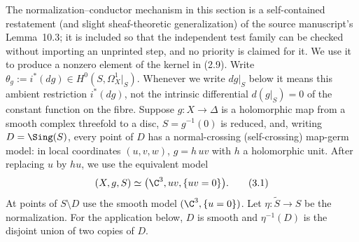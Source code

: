 The normalization--conductor mechanism in this section is a self-contained
restatement (and slight sheaf-theoretic generalization) of the source
manuscript's Lemma~10.3; it is included so that the independent test family
can be checked without importing an unprinted step, and no priority is
claimed for it.  We use it to produce a nonzero element of the kernel in
(2.9).  Write
\(\theta_g:=i^*(dg)\in H^0(S,\Omega^1_X|_S)\).  Whenever we write
$dg|_S$ below it means this ambient restriction $i^*(dg)$, not the intrinsic
differential $d(g|_S)=0$ of the constant function on the fibre.  Suppose
$g:X\to\Delta$ is a holomorphic map from a smooth complex threefold to a
disc, $S=g^{-1}(0)$ is reduced, and, writing $D=\Sing(S)$, every point of
$D$ has a normal-crossing (self-crossing) map-germ model: in local coordinates
$(u,v,w)$, $g=h\,uv$ with $h$ a holomorphic unit.  After replacing $u$ by
$hu$, we use the equivalent model
\[
 (X,g,S)\simeq\bigl(\C^3,uv,\{uv=0\}\bigr).
 \tag{3.1}
\]
At points of $S\setminus D$ use the smooth model $(\C^3,\{u=0\})$.
Let $\eta:\widetilde S\to S$ be the normalization.
For the application below, $D$ is smooth and $\eta^{-1}(D)$ is the disjoint
union of two copies of $D$.

